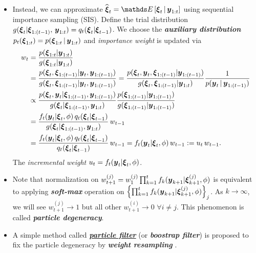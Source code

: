 \documentclass[11pt]{article}
\begin{document}
\begin{itemize}
\item Instead, we can approximate $\widehat{\mb{\xi}}_{t} = \E{}{\mb{\xi}_{t} \,|\, \mb{y}_{1:t}}$ using sequential importance sampling (SIS). Define the trial distribution $g(\boldsymbol{\xi}_{t}|\boldsymbol{\xi}_{1:(t-1)},\,\boldsymbol{y}_{1:t} ) = q_{t}(\boldsymbol{\xi}_{t} | \boldsymbol{\xi}_{t-1})$. We choose the \emph{\textbf{auxiliary distribution}} $p_t(\boldsymbol{\xi}_{1:t}) = p(\boldsymbol{\xi}_{1:t}\,|\,\boldsymbol{y}_{1:t})$ and \emph{importance weight} is updated via
\begin{align}
w_{t} &= \frac{p(\boldsymbol{\xi}_{1:t} | \boldsymbol{y}_{1:t})}{g(\boldsymbol{\xi}_{1:t} | \boldsymbol{y}_{1:t})} \label{eqn: particle_filter_weight}\\
&= \frac{p(\boldsymbol{\xi}_{t}, \boldsymbol{\xi}_{1:(t-1)} | \boldsymbol{y}_{t}, \boldsymbol{y}_{1:(t-1)})}{g(\boldsymbol{\xi}_{t}, \boldsymbol{\xi}_{1:(t-1)} | \boldsymbol{y}_{t}, \boldsymbol{y}_{1:(t-1)})} = \frac{p(\boldsymbol{\xi}_{t}, \boldsymbol{y}_{t},\boldsymbol{\xi}_{1:(t-1)} | \boldsymbol{y}_{1:(t-1)})}{g(\boldsymbol{\xi}_{t}, \boldsymbol{\xi}_{1:(t-1)} |  \boldsymbol{y}_{1:t})} \frac{1}{p(\boldsymbol{y}_{t}\,|\,\boldsymbol{y}_{1:(t-1)}) } \nonumber\\
&\propto \frac{p(\boldsymbol{\xi}_{t}, \boldsymbol{y}_{t}|\boldsymbol{\xi}_{1:(t-1)},\boldsymbol{y}_{1:(t-1)})}{g(\boldsymbol{\xi}_{t} |\boldsymbol{\xi}_{1:(t-1)},\boldsymbol{y}_{1:t})}  \frac{p(\boldsymbol{\xi}_{1:(t-1)} | \boldsymbol{y}_{1:(t-1)})}{g(\boldsymbol{\xi}_{1:(t-1)} | \boldsymbol{y}_{1:(t-1)})} \nonumber\\
&= \frac{f_t(\boldsymbol{y}_{t}|\boldsymbol{\xi}_{t}, \phi)\,q_t(\boldsymbol{\xi}_{t}|\boldsymbol{\xi}_{t-1})}{g(\boldsymbol{\xi}_{t}|\boldsymbol{\xi}_{1:(t-1)}, \boldsymbol{y}_{1:t})}\,w_{t-1} \nonumber\\
&=\frac{f_t(\boldsymbol{y}_{t}|\boldsymbol{\xi}_{t}, \phi)\,q_t(\boldsymbol{\xi}_{t}|\boldsymbol{\xi}_{t-1})}{q_{t}(\boldsymbol{\xi}_{t} | \boldsymbol{\xi}_{t-1})}\,w_{t-1} = f_{t}(\boldsymbol{y}_t | \boldsymbol{\xi}_{t}, \phi)\,w_{t-1} := u_t\,w_{t-1}  \label{eqn: particle_filter_weight_update}.
\end{align}
The \emph{incremental weight} $u_t = f_{t}(\boldsymbol{y}_t | \boldsymbol{\xi}_{t}, \phi)$.

\item Note that normalization on $w_{t+1}^{(j)} = w_{1}^{(j)}\prod_{k=1}^{t}f_{k}(\boldsymbol{y}_{k+1} | \boldsymbol{\xi}_{k+1}^{(j)}, \phi)$ is equivalent to applying \emph{\textbf{soft-max}} operation on $\left\{\prod_{k=1}^{t}f_{k}(\boldsymbol{y}_{k+1} | \boldsymbol{\xi}_{k+1}^{(j)}, \phi)\right\}_{j}$.  As $k\rightarrow \infty$, we will see $w_{t+1}^{(j)} \rightarrow 1$ but all other $w_{t+1}^{(i)} \rightarrow 0$ $\forall i\neq j$. This phenomenon is called \emph{\textbf{particle degeneracy}}. 


\item A simple method called \underline{\emph{\textbf{particle filter}}} (or \emph{\textbf{boostrap filter}}) is proposed to fix the particle degeneracy by  \emph{\textbf{weight resampling}} \citep{liu2001monte}.


\end{itemize}
\end{document}
